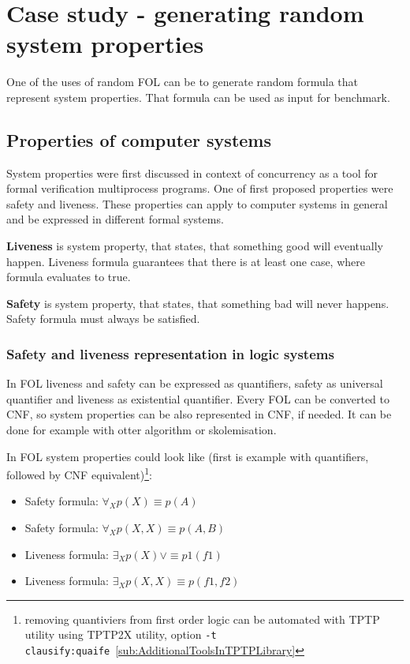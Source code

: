 \chapter{Case study - generating random system properties}

One of the uses of random \gls{FOL} can be to generate random formula that represent system properties. That formula can be used as input for benchmark.

\section{Properties of computer systems}

System properties were first discussed in context of concurrency \cite{Lampert77} as a tool for formal verification multiprocess programs. One of first proposed properties were safety and liveness. These properties can apply to computer systems in general and be expressed in different formal systems.

\textbf{Liveness} \cite{Klimek99} is system property, that states, that something good will eventually happen.
Liveness formula guarantees that there is at least one case, where formula evaluates to true.

\textbf{Safety} \cite{Klimek99} is system property, that states, that something bad will never happens.
Safety formula must always be satisfied.

\subsection{Safety and liveness representation in logic systems}

In \gls{FOL} liveness and safety can be expressed as quantifiers, safety as universal quantifier and liveness as existential quantifier. Every \gls{FOL} can be converted to \gls{CNF}, so system properties can be also represented in \gls{CNF}, if needed. It can be done for example with otter algorithm \cite{McC-Otter-URL} or skolemisation.

In \gls{FOL} system properties could look like (first is example with quantifiers, followed by CNF equivalent)\footnote{removing quantiviers from first order logic can be automated with TPTP utility using TPTP2X utility, option \texttt{-t clausify:quaife}~\ref{sub:AdditionalToolsInTPTPLibrary} }:
\begin{itemize}
  \item Safety formula: $\forall_X p(X) \equiv p(A)$
  \item Safety formula: $\forall_X p(X, X) \equiv p(A, B)$
  \item Liveness formula: $\exists_X p(X) \lor \equiv p1(f1)$
  \item Liveness formula: $\exists_X p(X, X) \equiv p(f1, f2)$
\end{itemize}

